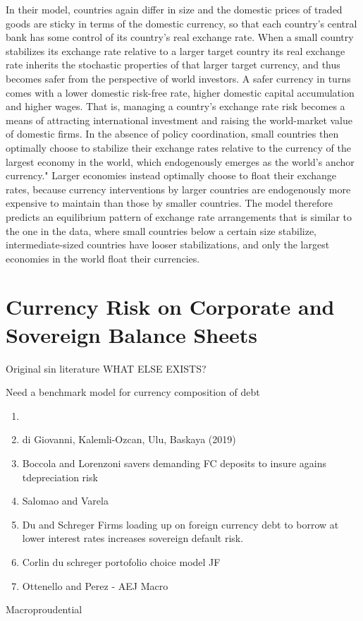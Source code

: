 \documentclass{ar-1col}
\begin{document}
In their model, countries again differ in size and the domestic prices of traded goods are sticky in terms of the domestic currency, so that each country's central bank has some control of its country's real exchange rate. When a small country stabilizes its exchange rate relative to a larger target country its real exchange rate inherits the stochastic properties of that larger target currency, and thus becomes safer from the perspective of world investors. A safer currency in turns comes with a lower domestic risk-free rate, higher domestic capital accumulation and higher wages. That is, managing a country's exchange rate risk becomes a means of attracting international investment and raising the world-market value of domestic firms. 
In the absence of policy coordination, small countries then optimally choose to
stabilize their exchange rates relative to the currency of the largest economy in the world,
which endogenously emerges as the world's anchor currency." Larger economies instead
optimally choose to 
float their exchange rates, because currency interventions by larger countries are endogenously more expensive to maintain than those by smaller countries. The model therefore predicts an equilibrium pattern of exchange rate arrangements that is similar to the one in the data, where small countries below a certain size stabilize, intermediate-sized countries have looser stabilizations, and only the largest economies in the world float their currencies.

\section{Currency Risk on Corporate and Sovereign Balance Sheets\label{sec_balancesheets}}
Original sin literature WHAT ELSE EXISTS?

Need a benchmark model for currency composition of debt
\begin{enumerate}
\item \citet{Richers2020}
\item di Giovanni, Kalemli-Ozcan, Ulu, Baskaya (2019)
\item Boccola and Lorenzoni savers demanding FC deposits to insure agains tdepreciation risk
\item Salomao and Varela
\item Du and Schreger Firms loading up on foreign currency debt to borrow at lower interest rates increases sovereign default risk.
\item Corlin du schreger portofolio choice model JF
\item Ottenello and Perez - AEJ Macro
\end{enumerate} 
Macroproudential
\end{document}
